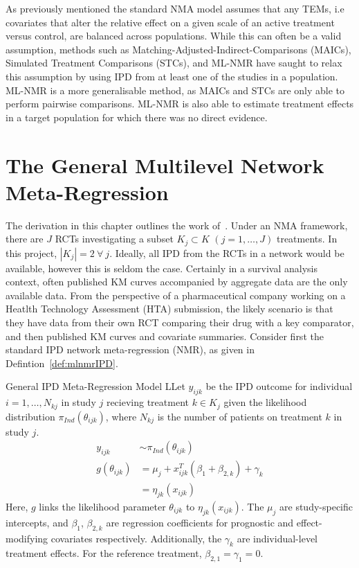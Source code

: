 As previously mentioned the standard NMA model assumes that any TEMs, i.e covariates that alter the relative effect on a given scale of an active treatment versus control, are balanced across populations. While this can often be a valid assumption, methods such as Matching-Adjusted-Indirect-Comparisons (MAICs), Simulated Treatment Comparisons (STCs), and ML-NMR have saught to relax this assumption by using IPD from at least one of the studies in a population. ML-NMR is a more generalisable method, as MAICs and STCs are only able to perform pairwise comparisons. ML-NMR is also able to estimate treatment effects in a target population for which there was no direct evidence.

\section{The General Multilevel Network Meta-Regression}
The derivation in this chapter outlines the work of~\cite{phillippo2024}. Under an NMA framework, there are $J$ RCTs investigating a subset $K_j \subset K$ $(j = 1,\ldots,J)$ treatments. In this project, $|K_j| = 2 \ \forall \ j$. Ideally, all IPD from the RCTs in a network would be available, however this is seldom the case. Certainly in a survival analysis context, often published KM curves accompanied by aggregate data are the only available data. From the perspective of a pharmaceutical company working on a Heatlth Technology Assessment (HTA) submission, the likely scenario is that they have data from their own RCT comparing their drug with a key comparator, and then published KM curves and covariate summaries. Consider first the standard IPD network meta-regression (NMR), as given in Defintion~\ref{def:mlnmrIPD}.

\begin{definition}[label=def:mlnmrIPD]{General IPD Meta-Regression Model}
    LLet $y_{ijk}$ be the IPD outcome for individual $i = 1, \ldots, N_{kj}$ in study $j$ recieving treatment $k \in K_j$ given the likelihood distribution $\pi_{Ind}(\theta_{ijk})$, where $N_{kj}$ is the number of patients on treatment $k$ in study $j$.
    \begin{align*}
        y_{ijk} &\sim \pi_{Ind}(\theta_{ijk}) \\
        g(\theta_{ijk}) &= \mu_j + x^T_{ijk}(\beta_1 + \beta_{2,k}) + \gamma_k \\
                        &= \eta_{jk}(x_{ijk})
    \end{align*}
    Here, $g$ links the likelihood parameter $\theta_{ijk}$ to $\eta_{jk}(x_{ijk})$. The $\mu_j$ are study-specific intercepts, and $\beta_1$, $\beta_{2,k}$ are regression coefficients for prognostic and effect-modifying covariates respectively. Additionally, the $\gamma_k$ are individual-level treatment effects. For the reference treatment, $\beta_{2,1} = \gamma_1 = 0$.
\end{definition}

